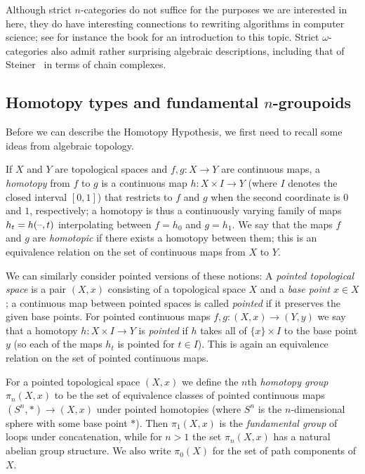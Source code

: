 \documentclass[a4paper,11pt]{article}
\begin{document}
\begin{remark}
  Although strict $n$-categories do not suffice for the purposes we
  are interested in here, they do have interesting connections to
  rewriting algorithms in computer science; see for instance the book
  \cite{Polygraphs} for an introduction to this topic. Strict
  $\omega$-categories also admit rather surprising algebraic
  descriptions, including that of Steiner~\cite{Steiner} in terms of
  chain complexes.
\end{remark}


\subsection{Homotopy types and fundamental $n$-groupoids}\label{subsec:htpy}
Before we can describe the Homotopy Hypothesis, we first need to
recall some ideas from algebraic topology.

\begin{defn}
  If $X$ and $Y$ are topological spaces and $f,g \colon X \to Y$ are
  continuous maps, a \emph{homotopy} from $f$ to $g$ is a continuous
  map $h \colon X \times I \to Y$ (where $I$ denotes the closed
  interval $[0,1]$) that restricts to $f$ and $g$ when the second
  coordinate is $0$ and $1$, respectively; a homotopy is thus a
  continuously varying family of maps $h_{t} = h(\text{\textendash},t)$
  interpolating between $f=h_{0}$ and $g=h_{1}$. We say that the maps
  $f$ and $g$ are \emph{homotopic} if there exists a homotopy between
  them; this is an equivalence relation on the set of continuous maps
  from $X$ to $Y$.
\end{defn}

\begin{variant}
  We can similarly consider pointed versions of these notions: A
  \emph{pointed topological space} is a pair $(X,x)$ consisting of a
  topological space $X$ and a \emph{base point} $x \in X$; a
  continuous map between pointed spaces is called \emph{pointed} if it
  preserves the given base points. For pointed continuous maps
  $f,g \colon (X,x) \to (Y,y)$ we say that a homotopy
  $h \colon X \times I \to Y$ is \emph{pointed} if $h$ takes all of
  $\{x\} \times I$ to the base point $y$ (so each of the maps $h_{t}$
  is pointed for $t \in I$). This is again an equivalence relation on
  the set of pointed continuous maps.
\end{variant}

\begin{defn}
  For a pointed topological space $(X,x)$ we define the $n$th
  \emph{homotopy group} $\pi_{n}(X,x)$ to be the set of equivalence
  classes of pointed continuous maps $(S^{n},*) \to (X,x)$ under
  pointed homotopies (where $S^{n}$ is the $n$-dimensional sphere with
  some base point $*$). Then $\pi_{1}(X,x)$ is the \emph{fundamental
    group} of loops under concatenation, while for $n > 1$ the set
  $\pi_{n}(X,x)$ has a natural abelian group structure. We also write
  $\pi_{0}(X)$ for the set of path components of $X$.
\end{defn}
\end{document}
